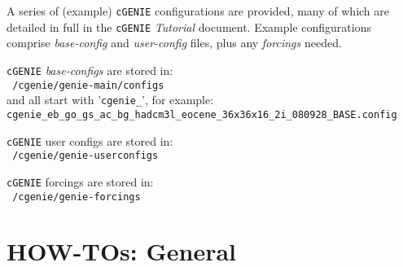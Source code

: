 \documentclass[10pt,twoside]{article}
\begin{document}
A series of (example) \texttt{cGENIE} configurations are provided, many of which are detailed in full in the \texttt{cGENIE} \textit{Tutorial} document.
Example configurations comprise \textit{base-config} and \textit{user-config} files, plus any \textit{forcings} needed.
\begin{compactitem}
        \item
  \texttt{cGENIE} \textit{base-configs} are stored in:
        \\ \texttt{~/cgenie/genie-main/configs}
        \\and all start with '\texttt{cgenie\_}', for example: \\ \texttt{cgenie\_eb\_go\_gs\_ac\_bg\_hadcm3l\_eocene\_36x36x16\_2i\_080928\_BASE.config}
        \item
        \texttt{cGENIE} user configs are stored in:
        \\ \texttt{~/cgenie/genie-userconfigs}
        \item
        \texttt{cGENIE} forcings are stored in:
        \\ \texttt{~/cgenie/genie-forcings}
\end{compactitem}


\newpage
\section{HOW-TOs: General}\label{how-to-1}


\end{document}
